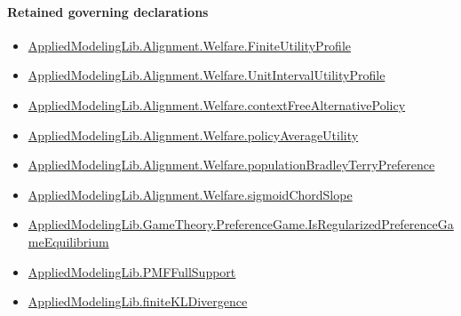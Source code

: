 \documentclass[10pt]{article}
\begin{document}
\paragraph{Retained governing declarations}
\begin{itemize}\raggedright
\item \hyperlink{library-prerequisite-56c0734f8877ddbe}{Applied\allowbreak{}Modeling\allowbreak{}Lib.\allowbreak{}Alignment.\allowbreak{}Welfare.\allowbreak{}Finite\allowbreak{}Utility\allowbreak{}Profile}
\item \hyperlink{library-prerequisite-cbe8afa0d6d1ba78}{Applied\allowbreak{}Modeling\allowbreak{}Lib.\allowbreak{}Alignment.\allowbreak{}Welfare.\allowbreak{}Unit\allowbreak{}Interval\allowbreak{}Utility\allowbreak{}Profile}
\item \hyperlink{governing-declaration-b7cf9e04e23161e5}{Applied\allowbreak{}Modeling\allowbreak{}Lib.\allowbreak{}Alignment.\allowbreak{}Welfare.\allowbreak{}context\allowbreak{}Free\allowbreak{}Alternative\allowbreak{}Policy}
\item \hyperlink{library-prerequisite-184c74a4db4311c2}{Applied\allowbreak{}Modeling\allowbreak{}Lib.\allowbreak{}Alignment.\allowbreak{}Welfare.\allowbreak{}policy\allowbreak{}Average\allowbreak{}Utility}
\item \hyperlink{library-prerequisite-cf06d15d7f8b7c31}{Applied\allowbreak{}Modeling\allowbreak{}Lib.\allowbreak{}Alignment.\allowbreak{}Welfare.\allowbreak{}population\allowbreak{}Bradley\allowbreak{}Terry\allowbreak{}Preference}
\item \hyperlink{governing-declaration-a4d623b8c608b566}{Applied\allowbreak{}Modeling\allowbreak{}Lib.\allowbreak{}Alignment.\allowbreak{}Welfare.\allowbreak{}sigmoid\allowbreak{}Chord\allowbreak{}Slope}
\item \hyperlink{governing-declaration-49e6e1fe2a2cc849}{Applied\allowbreak{}Modeling\allowbreak{}Lib.\allowbreak{}Game\allowbreak{}Theory.\allowbreak{}Preference\allowbreak{}Game.\allowbreak{}Is\allowbreak{}Regularized\allowbreak{}Preference\allowbreak{}Game\allowbreak{}Equilibrium}
\item \hyperlink{library-prerequisite-268c959ee7d2d148}{Applied\allowbreak{}Modeling\allowbreak{}Lib.\allowbreak{}PMF\allowbreak{}Full\allowbreak{}Support}
\item \hyperlink{library-prerequisite-d3573881ae45d4c6}{Applied\allowbreak{}Modeling\allowbreak{}Lib.\allowbreak{}finite\allowbreak{}KL\allowbreak{}Divergence}
\end{itemize}
\end{document}
